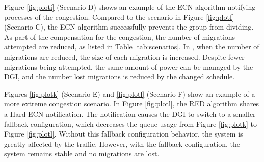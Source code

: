 
Figure \ref{fig:ploti} (Scenario D) shows an example of the \ac{ECN} algorithm notifying processes of the congestion.
Compared to the scenario in Figure \ref{fig:plotf} (Scenario C), the \ac{ECN} algorithm successfully prevents the group from dividing.
As part of the compensation for the congestion, the number of migrations attempted are reduced, as listed in Table \ref{tab:scenarios}.
In \cite{ecn-cloudhari}, when the number of migrations are reduced, the size of each migration is increased.
Despite fewer migrations being attempted, the same amount of power can be managed by the \ac{DGI}, and the number lost migrations is reduced by the changed schedule.

Figures \ref{fig:plotk} (Scenario E) and \ref{fig:plotl} (Scenario F) show an example of a more extreme congestion scenario.
In Figure \ref{fig:plotl}, the \ac{RED} algorithm shares a Hard \ac{ECN} notification.
The notification causes the \ac{DGI} to switch to a smaller fallback configuration, which decreases the queue usage from Figure \ref{fig:plotk} to Figure \ref{fig:plotl}.
Without this fallback configuration behavior, the system is greatly affected by the traffic.
However, with the fallback configuration, the system remains stable and no migrations are lost.

